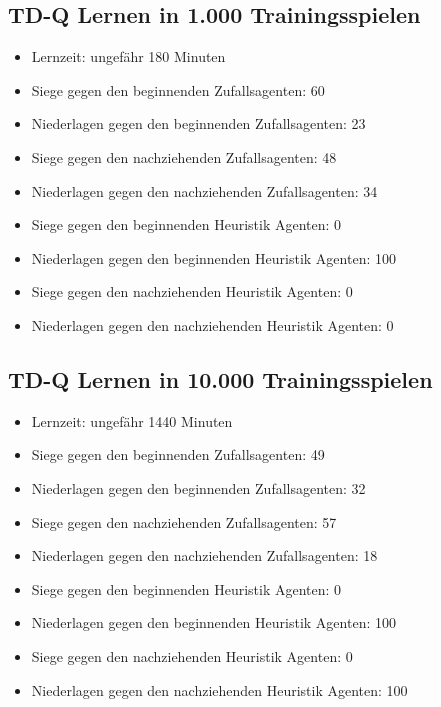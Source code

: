 \subsection{TD-Q Lernen in 1.000 Trainingsspielen}
\begin{itemize}
\item Lernzeit: ungefähr 180 Minuten

\item Siege gegen den beginnenden Zufallsagenten: 60
\item Niederlagen gegen den beginnenden Zufallsagenten: 23 

\item Siege gegen den nachziehenden Zufallsagenten: 48
\item Niederlagen gegen den nachziehenden Zufallsagenten: 34 

\item Siege gegen den beginnenden Heuristik Agenten: 0
\item Niederlagen gegen den beginnenden Heuristik Agenten: 100

\item Siege gegen den nachziehenden Heuristik Agenten: 0
\item Niederlagen gegen den nachziehenden Heuristik Agenten: 0

\end{itemize}


\subsection{TD-Q Lernen in 10.000 Trainingsspielen}
\begin{itemize}
\item Lernzeit: ungefähr 1440 Minuten

\item Siege gegen den beginnenden Zufallsagenten: 49
\item Niederlagen gegen den beginnenden Zufallsagenten: 32 

\item Siege gegen den nachziehenden Zufallsagenten: 57
\item Niederlagen gegen den nachziehenden Zufallsagenten: 18 

\item Siege gegen den beginnenden Heuristik Agenten: 0
\item Niederlagen gegen den beginnenden Heuristik Agenten: 100 

\item Siege gegen den nachziehenden Heuristik Agenten: 0
\item Niederlagen gegen den nachziehenden Heuristik Agenten: 100 
\end{itemize}
